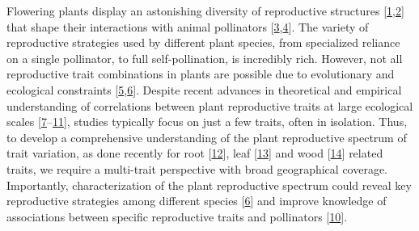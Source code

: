 \documentclass[
  12pt,
  a4paper,
]{article}
\begin{document}
Flowering plants display an astonishing diversity of reproductive structures {[}\protect\hyperlink{ref-barrett2002}{1},\protect\hyperlink{ref-schiestl2013}{2}{]} that shape their interactions with animal pollinators {[}\protect\hyperlink{ref-fenster2004}{3},\protect\hyperlink{ref-dellinger2020}{4}{]}. The variety of reproductive strategies used by different plant species, from specialized reliance on a single pollinator, to full self-pollination, is incredibly rich. However, not all reproductive trait combinations in plants are possible due to evolutionary and ecological constraints {[}\protect\hyperlink{ref-stearns1989}{5},\protect\hyperlink{ref-agrawal2020}{6}{]}. Despite recent advances in theoretical and empirical understanding of correlations between plant reproductive traits at large ecological scales {[}\protect\hyperlink{ref-salguero2016}{7}--\protect\hyperlink{ref-song2022}{11}{]}, studies typically focus on just a few traits, often in isolation. Thus, to develop a comprehensive understanding of the plant reproductive spectrum of trait variation, as done recently for root {[}\protect\hyperlink{ref-laughlin2021}{12}{]}, leaf {[}\protect\hyperlink{ref-wright2004}{13}{]} and wood {[}\protect\hyperlink{ref-chave2009}{14}{]} related traits, we require a multi-trait perspective with broad geographical coverage. Importantly, characterization of the plant reproductive spectrum could reveal key reproductive strategies among different species {[}\protect\hyperlink{ref-agrawal2020}{6}{]} and improve knowledge of associations between specific reproductive traits and pollinators {[}\protect\hyperlink{ref-roddy2021}{10}{]}.
\end{document}
